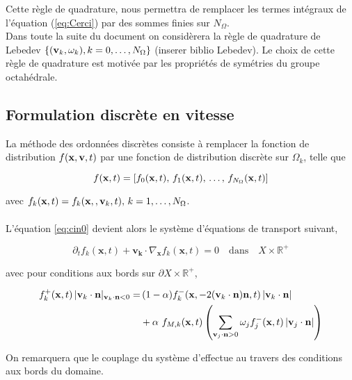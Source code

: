 Cette règle de quadrature, nous permettra de remplacer les termes intégraux de l'équation (\ref{eq:Cerci}) par des sommes finies sur $N_{\Omega}$.\\

Dans toute la suite du document on considèrera la règle de quadrature de Lebedev $\left\{ (\mathbf{v}_k, \omega_k), k=0,\dots,N_{\Omega} \right\}$  (inserer biblio Lebedev). 
 Le choix de cette règle de quadrature est motivée par les propriétés de symétries du groupe octahédrale.


\subsection{Formulation discrète en vitesse}

La méthode des ordonnées discrètes consiste à remplacer la fonction de distribution $f(\mathbf{x},\mathbf{v},t)$ par une fonction de distribution discrète sur $\Omega_k$, telle que 

\begin{equation}
\label{eq:ch125}
f(\mathbf{x},t) = \left[ f_0(\mathbf{x},t),\, f_1(\mathbf{x},t),\,\dots,\, f_{N_{\Omega}}(\mathbf{x},t) \right]
\end{equation}

avec  $f_k(\mathbf{x},t) =  f_k(\mathbf{x},,\mathbf{v}_k,t),\, k = 1,\dots, N_{\Omega}$.\\
\\
L'équation \ref{eq:cin0} devient alors le système d'équations de transport suivant,

\begin{equation}
\label{eq:cin0}
\partial_t f_k(\mathbf{x},t) + \mathbf{v_k} \cdot \nabla_{\mathbf{x}}  f_k(\mathbf{x},t) = 0  \quad \mbox{dans} \quad  X \times \mathbb{R}^+
\end{equation}

avec pour conditions aux bords sur $\partial X \times \mathbb{R}^+$,

\begin{equation}
\label{eq:cin0}
\begin{aligned}
f_k^+(\mathbf{x},t) \, |\mathbf{v}_k \cdot \mathbf{n} |_{ \mathbf{v}_k \cdot \mathbf{n} < 0}  =  &\,(1-\alpha) f_k^-(\mathbf{x},- 2(\mathbf{v}_k \cdot \mathbf{n})\mathbf{n} , t) \, |\mathbf{v}_k \cdot \mathbf{n} | \\
&+ \alpha\  f_{M,k}(\mathbf{x},t) \left( \sum_{\mathbf{v}_j \cdot \mathbf{n} > 0} \omega_j f^-_j(\mathbf{x},t)\, |\mathbf{v}_j \cdot \mathbf{n} | \right)
\end{aligned}
\end{equation}

On remarquera que le couplage du système d'effectue au travers des conditions aux bords du domaine.\\


